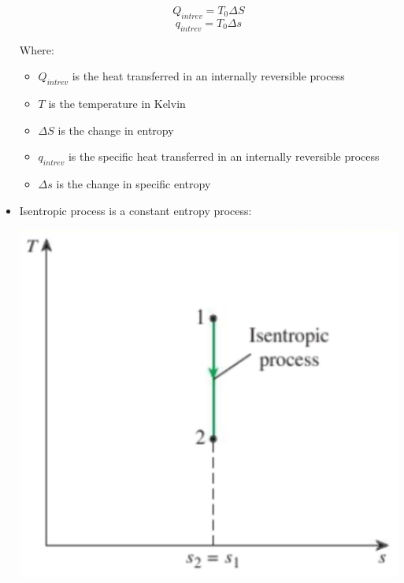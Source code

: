 \documentclass[11pt]{article}
\begin{document}
\begin{itemize}
\[Q_{int rev} = T_0 \Delta S\]
\[q_{int rev} = T_0 \Delta s\]

Where:
\begin{itemize}
\item \(Q_{int rev}\) is the heat transferred in an internally reversible process
\item \(T\) is the temperature in Kelvin
\item \(\Delta S\) is the change in entropy
\item \(q_{int rev}\) is the specific heat transferred in an internally reversible process
\item \(\Delta s\) is the change in specific entropy
\end{itemize}

\item Isentropic process is a constant entropy process:
\begin{center}
\includegraphics[scale=0.65]{./images/isentropic-process.png}
\end{center}
\end{itemize}
\end{document}
